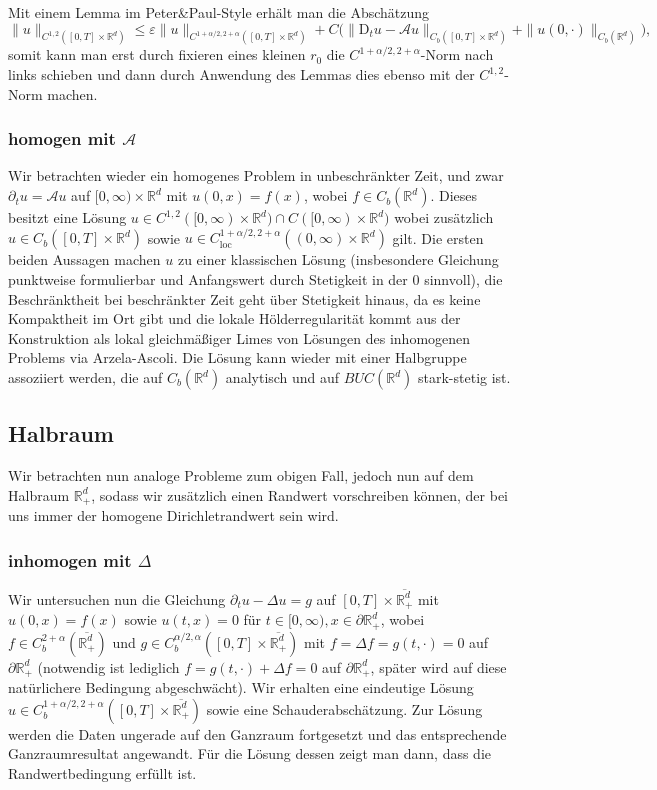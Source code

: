 \documentclass[11pt,a4paper]{scrartcl}
\newcommand{\R}{\mathbb{R}} %
\newcommand{\A}{\mathcal{A}}
\theoremstyle{plain}
\theoremstyle{definition}
\theoremstyle{remark}
\begin{document}
Mit einem Lemma im Peter\&Paul-Style erhält man die Abschätzung $$\|u\|_{C^{1,2}([0,T]\times \R^d)} \leq \varepsilon \|u\|_{C^{1+\alpha/2,2+\alpha}([0,T]\times \R^d)} + C \big( \|\mathrm{D}_t u-\A u\|_{C_b([0,T]\times \R^d)} + \|u(0,\cdot)\|_{C_b(\R^d)} \big),$$ somit kann man erst durch fixieren eines kleinen $r_0$ die $C^{1+\alpha/2,2+\alpha}$-Norm nach links schieben und dann durch Anwendung des Lemmas dies ebenso mit der $C^{1,2}$-Norm machen.

\subsubsection{homogen mit $\A$}

Wir betrachten wieder ein homogenes Problem in unbeschränkter Zeit, und zwar $\partial_t u = \A u$ auf $[0,\infty)\times \R^d$ mit $u(0,x)=f(x)$, wobei $f\in C_b(\R^d)$. Dieses besitzt eine Lösung $u\in C^{1,2}([0,\infty)\times \R^d) \cap C([0,\infty)\times \R^d)$ wobei zusätzlich $u\in C_b([0,T]\times \R^d)$ sowie $u\in C_\mathrm{loc}^{1+\alpha/2,2+\alpha}((0,\infty)\times \R^d)$ gilt. Die ersten beiden Aussagen machen $u$ zu einer klassischen Lösung (insbesondere Gleichung punktweise formulierbar und Anfangswert durch Stetigkeit in der $0$ sinnvoll), die Beschränktheit bei beschränkter Zeit geht über Stetigkeit hinaus, da es keine Kompaktheit im Ort gibt und die lokale Hölderregularität kommt aus der Konstruktion als lokal gleichmäßiger Limes von Lösungen des inhomogenen Problems via Arzela-Ascoli. Die Lösung kann wieder mit einer Halbgruppe assoziiert werden, die auf $C_b(\R^d)$ analytisch und auf $BUC(\R^d)$ stark-stetig ist.

\subsection{Halbraum}

Wir betrachten nun analoge Probleme zum obigen Fall, jedoch nun auf dem Halbraum $\R^d_+$, sodass wir zusätzlich einen Randwert vorschreiben können, der bei uns immer der homogene Dirichletrandwert sein wird.

\subsubsection{inhomogen mit $\Delta$}

Wir untersuchen nun die Gleichung $\partial_t u - \Delta u = g$ auf $[0,T] \times \overline{\R^d_+}$ mit $u(0,x)=f(x)$ sowie $u(t,x)=0$ für $t\in [0,\infty), x\in \partial \R^d_+$, wobei $f\in C_b^{2+\alpha}(\overline{\R^d_+})$ und $g\in C_b^{\alpha/2, \alpha}([0,T] \times \overline{\R^d_+})$ mit $f=\Delta f = g(t,\cdot)=0$ auf $\partial \R^d_+$ (notwendig ist lediglich $f=g(t,\cdot)+\Delta f=0$ auf $\partial \R^d_+$, später wird auf diese natürlichere Bedingung abgeschwächt). Wir erhalten eine eindeutige Lösung $u\in C_b^{1+\alpha/2, 2+\alpha}([0,T]\times \overline{\R^d_+})$ sowie eine Schauderabschätzung. Zur Lösung werden die Daten ungerade auf den Ganzraum fortgesetzt und das entsprechende Ganzraumresultat angewandt. Für die Lösung dessen zeigt man dann, dass die Randwertbedingung erfüllt ist. 
\end{document}
